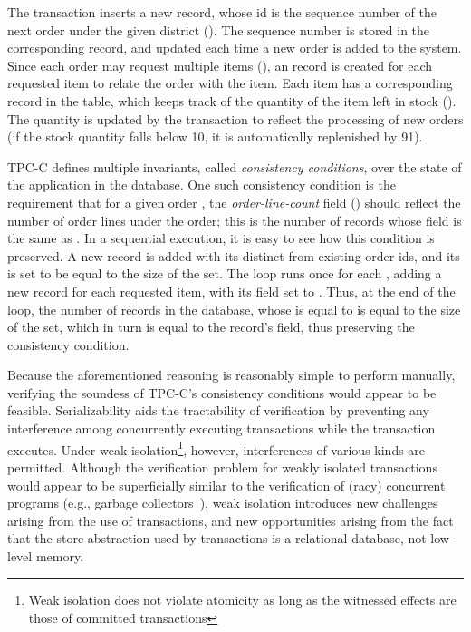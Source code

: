The  transaction inserts a new  record, whose
id is the sequence number of the next order under the given district
(). The sequence number is stored in the corresponding
 record, and updated each time a new order is added to the
system. Since each order may request multiple items (),
an  record is created for each requested item to relate
the order with the item. Each item has a corresponding record in the
 table, which keeps track of the quantity of the item left in
stock (). The quantity is updated by the transaction to
reflect the processing of new orders (if the stock quantity falls below
10, it is automatically replenished by 91).

TPC-C defines multiple invariants, called \emph{consistency
conditions}, over the state of the application in the database. One
such consistency condition is the requirement that for a given order
, the \emph{order-line-count} field () should
reflect the number of order lines under the order; this is the number
of  records whose  field is the same as
.  In a sequential execution, it is easy to see how this
condition is preserved.  A new  record is added with its
 distinct from existing order ids, and its  is
set to be equal to the size of the  set. The 
loop runs once for each , adding a new 
record for each requested item, with its  field set to
. Thus, at the end of the loop, the number of 
records in the database, whose  is equal to  is
equal to the size of the  set, which in turn is equal to
the  record's  field, thus preserving the
consistency condition.

Because the aforementioned reasoning is reasonably simple to perform
manually, verifying the soundess of TPC-C's consistency conditions
would appear to be feasible.  Serializability aids the tractability of
verification by preventing any interference among concurrently
executing transactions while the  transaction executes.
Under weak isolation\footnote{Weak isolation does not violate
  atomicity as long as the witnessed effects are those of committed
  transactions}, however, interferences of various kinds are
permitted.  Although the verification problem for weakly isolated
transactions would appear to be superficially similar to the
verification of (racy) concurrent programs (e.g., garbage
collectors~\cite{JLP+14,GHE15,HPQ+15}), weak isolation introduces new
challenges arising from the use of transactions, and new opportunities
arising from the fact that the store abstraction used by transactions
is a relational database, not low-level memory.

